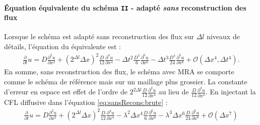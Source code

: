 \paragraph{Équation équivalente du schéma \texttt{II} - adapté \emph{sans} reconstruction des flux}
    Lorsque le schéma est adapté sans reconstruction des flux sur $\Delta l$ niveaux de détails,
    l'équation du équivalente est :
    \begin{align}\label{eq:sansRecons:brute}
        \frac{\partial}{\partial t} u=
            D \frac{\partial^{2}u}{\partial x^{2}}
            + (2^{\Delta l} \Delta x)^{2}  \frac{D}{12} \frac{\partial^{4}u}{\partial x^{4}}
            -\Delta t^{2} \frac{D^{3}}{6}   \frac{\partial^{6}u}{\partial x^{6}}
            -\Delta t^{3} \frac{D^{4} }{24} \frac{\partial^{8}u}{\partial x^{8}}
            + \mathcal{O}(\Delta x^4 , \Delta t^4).
    \end{align}
    En somme, sans reconstruction des flux, le schéma avec MRA se comporte comme le schéma de référence mais sur un maillage plus grossier. 
    La constante d'erreur en espace est effet de l'ordre de $2^{2\Delta l} \frac{D}{12} \frac{\partial^{4}u}{\partial x^{4}}$ 
    au lieu de $\frac{D}{12}\frac{\partial^{4}u}{\partial x^{4}}$.
    En injectant la CFL diffusive dans l'équation \eqref{eq:sansRecons:brute} :
    \begin{align}\label{eq:sansRecons:cfl}
        \frac{\partial}{\partial t} u=
            D \frac{\partial^{2}u}{\partial x^{2}}
            + (2^{\Delta l} \Delta x)^{2}  \frac{D}{12} \frac{\partial^{4}u}{\partial x^{4}}
            -\lambda^2 \Delta x^{4} \frac{D}{6}   \frac{\partial^{6}u}{\partial x^{6}}
            -\lambda^3 \Delta x^{6} \frac{D}{24} \frac{\partial^{8}u}{\partial x^{8}} + \mathcal{O}(\Delta x^7)
    \end{align}
